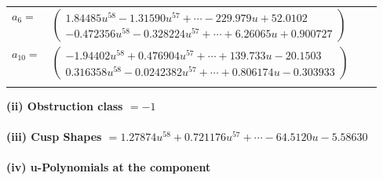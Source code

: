 \documentclass[1p]{elsarticle_modified}
\theoremstyle{definition}
\begin{document}
\begin{tabular}{m{7pt} m{180pt} m{7pt} m{180pt} }
\flushright $a_{6}=$&$\begin{pmatrix}1.84485 u^{58}-1.31590 u^{57}+\cdots-229.979 u+52.0102\\-0.472356 u^{58}-0.328224 u^{57}+\cdots+6.26065 u+0.900727\end{pmatrix}$ \\
\flushright $a_{10}=$&$\begin{pmatrix}-1.94402 u^{58}+0.476904 u^{57}+\cdots+139.733 u-20.1503\\0.316358 u^{58}-0.0242382 u^{57}+\cdots+0.806174 u-0.303933\end{pmatrix}$\\&\end{tabular}
\flushleft \textbf{(ii) Obstruction class $= -1$}\\~\\
\flushleft \textbf{(iii) Cusp Shapes $= 1.27874 u^{58}+0.721176 u^{57}+\cdots-64.5120 u-5.58630$}\\~\\
\newpage\renewcommand{\arraystretch}{1}
\flushleft \textbf{(iv) u-Polynomials at the component}\newline \\
\end{document}
